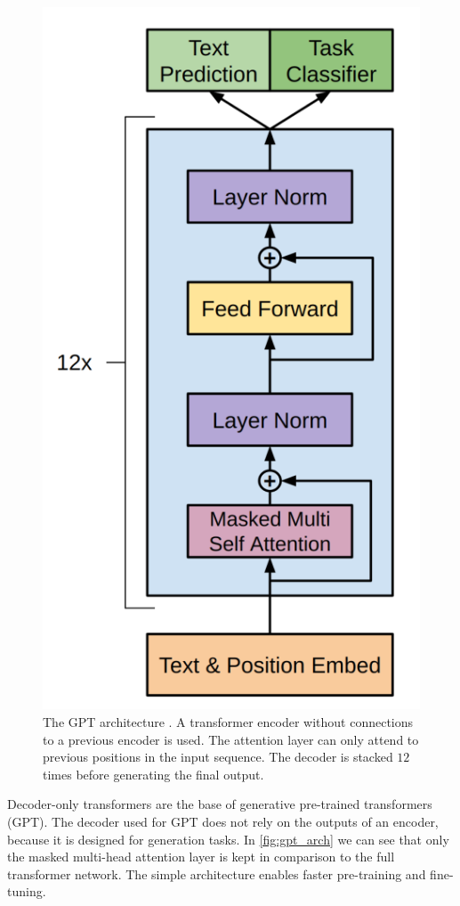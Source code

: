 \documentclass[../main.tex]{subfiles}
\begin{document}
\begin{figure}[t]
    \centering
    \includegraphics[scale=0.3]{include/images/gpt_architecture.png}
    \caption{
        The GPT architecture \cite{Radford2018}.
        A transformer encoder
        without connections to a previous encoder is used.
        The attention layer
        can only attend to previous positions in the input sequence.
        The decoder is stacked $12$ times before generating the final output.
    }
    \label{fig:gpt_arch}
\end{figure}


Decoder-only transformers are the base of generative pre-trained transformers (GPT).
The decoder used for GPT does not rely on the outputs of an encoder,
because it is designed for generation tasks.
In \autoref{fig:gpt_arch} we can see
that only the masked multi-head attention layer is kept in comparison to
the full transformer network.
The simple architecture enables faster pre-training and fine-tuning.
\end{document}
